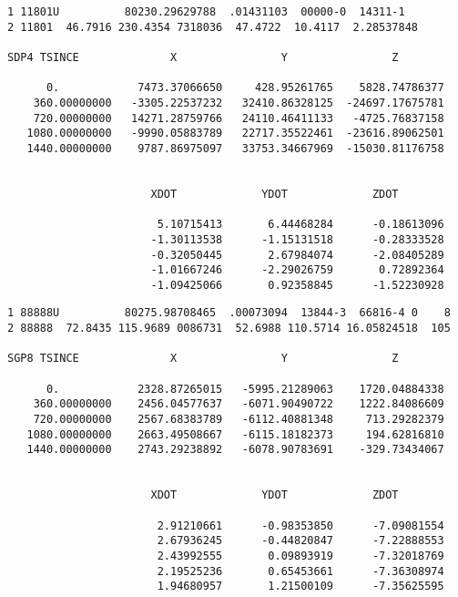\begin{verbatim}
1 11801U          80230.29629788  .01431103  00000-0  14311-1
2 11801  46.7916 230.4354 7318036  47.4722  10.4117  2.28537848

SDP4 TSINCE              X                Y                Z

      0.            7473.37066650     428.95261765    5828.74786377
    360.00000000   -3305.22537232   32410.86328125  -24697.17675781
    720.00000000   14271.28759766   24110.46411133   -4725.76837158
   1080.00000000   -9990.05883789   22717.35522461  -23616.89062501
   1440.00000000    9787.86975097   33753.34667969  -15030.81176758


                      XDOT             YDOT             ZDOT

                       5.10715413       6.44468284      -0.18613096
                      -1.30113538      -1.15131518      -0.28333528
                      -0.32050445       2.67984074      -2.08405289
                      -1.01667246      -2.29026759       0.72892364
                      -1.09425066       0.92358845      -1.52230928
\end{verbatim}
\newpage
\begin{verbatim}
1 88888U          80275.98708465  .00073094  13844-3  66816-4 0    8
2 88888  72.8435 115.9689 0086731  52.6988 110.5714 16.05824518  105

SGP8 TSINCE              X                Y                Z

      0.            2328.87265015   -5995.21289063    1720.04884338
    360.00000000    2456.04577637   -6071.90490722    1222.84086609
    720.00000000    2567.68383789   -6112.40881348     713.29282379
   1080.00000000    2663.49508667   -6115.18182373     194.62816810
   1440.00000000    2743.29238892   -6078.90783691    -329.73434067


                      XDOT             YDOT             ZDOT

                       2.91210661      -0.98353850      -7.09081554
                       2.67936245      -0.44820847      -7.22888553
                       2.43992555       0.09893919      -7.32018769
                       2.19525236       0.65453661      -7.36308974
                       1.94680957       1.21500109      -7.35625595
\end{verbatim}
\newpage
